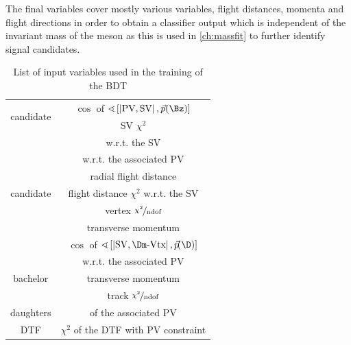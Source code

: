 The final variables cover mostly various \chisqip variables, flight distances, momenta and flight directions in order to obtain a classifier output which is independent of the invariant mass of the \Bz meson as this is used in \cref{ch:massfit} to further identify signal candidates.
\begin{table}[tbp]
	\centering
	\caption{List of input variables used in the training of the BDT}
	\begin{tabular}{cc}
		\toprule
		\multirow{2}{*}{\Bz candidate}	& $\cos$ of $\sphericalangle\left[\left|\text{PV},\text{SV}\right|,\vec{p}(\Bz)\right]$ \\
										& \ac{SV} $\chi^2$\\
		\midrule
		\multirow{7}{*}{\Dm candidate}	& \chisqip w.r.t. the \ac{SV}\\
										& \chisqip w.r.t. the associated PV\\
										& radial flight distance\\
										& flight distance $\chi^2$ w.r.t. the \ac{SV}\\
										& \Dm vertex $\nicefrac{\chi^2}{\text{ndof}}$\\
										& transverse momentum \pt \\
										& $\cos$ of $\sphericalangle\left[\left|\text{SV},\Dm\text{-Vtx}\right|,\vec{p}\!(\D)\right]$ \\
		\midrule
		\multirow{3}{*}{bachelor \pion}	& \chisqip w.r.t. the associated PV\\
										& transverse momentum \pt\\
										& track $\nicefrac{\chi^2}{\text{ndof}}$\\
		\midrule
		\Dm daughters					& \chisqip of the associated \ac{PV}\\
		\midrule
		DTF 							& $\chi^2$ of the DTF with \ac{PV} constraint \\
		\bottomrule
	\end{tabular}
	\label{tab:BDTInput}
\end{table}
